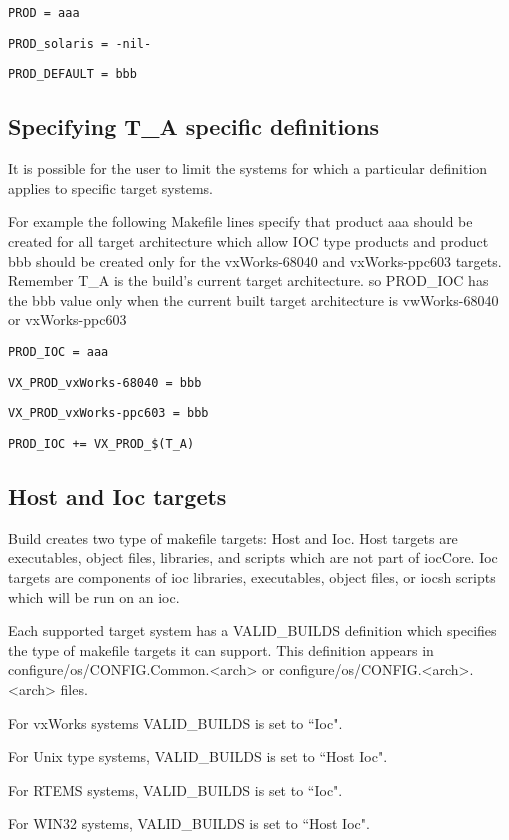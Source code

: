 \begin{description}
\item \verb|PROD = aaa|
\item \verb|PROD_solaris = -nil-|
\item \verb|PROD_DEFAULT = bbb|
\end{description}
\subsection{Specifying T\_A specific definitions}

It is possible for the user to limit the systems for which a particular definition applies to specific target systems. 

For example the following Makefile lines specify that product aaa should be created for all target architecture which allow 
IOC type products and product bbb should be created only for the vxWorks-68040 and vxWorks-ppc603 targets. 
Remember T\_A is the build's current target architecture. so PROD\_IOC has the bbb value only when the current built 
target architecture is vwWorks-68040 or vxWorks-ppc603

\begin{description}
\item \verb|PROD_IOC = aaa|
\item \verb|VX_PROD_vxWorks-68040 = bbb|
\item \verb|VX_PROD_vxWorks-ppc603 = bbb|
\item \verb|PROD_IOC += VX_PROD_$(T_A)|
\end{description}
\subsection{Host and Ioc targets}

Build creates two type of makefile targets: Host and Ioc. Host targets are executables, object files, libraries, and scripts 
which are not part of iocCore. Ioc targets are components of ioc libraries, executables, object files, or iocsh scripts which 
will be run on an ioc.

Each supported target system has a VALID\_BUILDS definition which specifies the type of makefile targets it can 
support. This definition appears in configure/os/CONFIG.Common.\textless{}arch\textgreater{} or configure/os/CONFIG.\textless{}arch\textgreater{}.\textless{}arch\textgreater{} files.
\begin{description}
\item For vxWorks systems VALID\_BUILDS is set to ``Ioc".
\item For Unix type systems, VALID\_BUILDS is set to ``Host Ioc".
\item For RTEMS systems, VALID\_BUILDS is set to ``Ioc".
\item For WIN32 systems, VALID\_BUILDS is set to ``Host Ioc".
\end{description}

